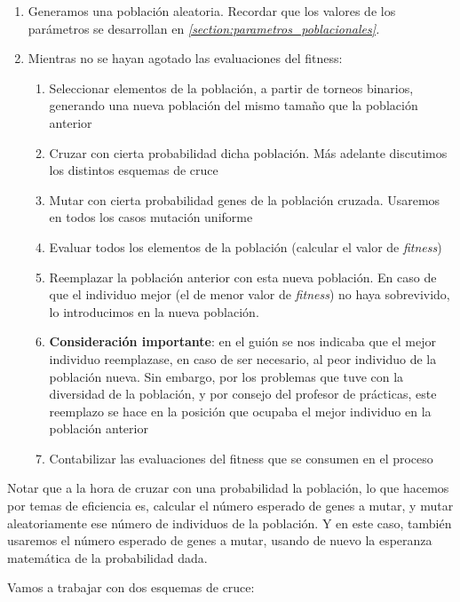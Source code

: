 \documentclass[11pt]{article}
\begin{document}
    \begin{enumerate}
        \item Generamos una población aleatoria. Recordar que los valores de los parámetros se desarrollan en \emph{\ref{section:parametros_poblacionales}. }
        \item Mientras no se hayan agotado las evaluaciones del fitness:
            \begin{enumerate}
                \item Seleccionar elementos de la población, a partir de torneos binarios, generando una nueva población del mismo tamaño que la población anterior
                \item Cruzar con cierta probabilidad dicha población. Más adelante discutimos los distintos esquemas de cruce
                \item Mutar con cierta probabilidad genes de la población cruzada. Usaremos en todos los casos mutación uniforme
                \item Evaluar todos los elementos de la población (calcular el valor de \emph{fitness})
                \item Reemplazar la población anterior con esta nueva población. En caso de que el individuo mejor (el de menor valor de \emph{fitness}) no haya sobrevivido, lo introducimos en la nueva población.
                \item \textbf{Consideración importante}: en el guión se nos indicaba que el mejor individuo reemplazase, en caso de ser necesario, al peor individuo de la población nueva. Sin embargo, por los problemas que tuve con la diversidad de la población, y por consejo del profesor de prácticas, este reemplazo se hace en la posición que ocupaba el mejor individuo en la población anterior
                \item Contabilizar las evaluaciones del fitness que se consumen en el proceso
        \end{enumerate}
\end{enumerate}

Notar que a la hora de cruzar con una probabilidad la población, lo que hacemos por temas de eficiencia es, calcular el número esperado de genes a mutar, y mutar aleatoriamente ese número de individuos de la población. Y en este caso, también usaremos el número esperado de genes a mutar, usando de nuevo la esperanza matemática de la probabilidad dada.

Vamos a trabajar con dos esquemas de cruce:
\end{document}
